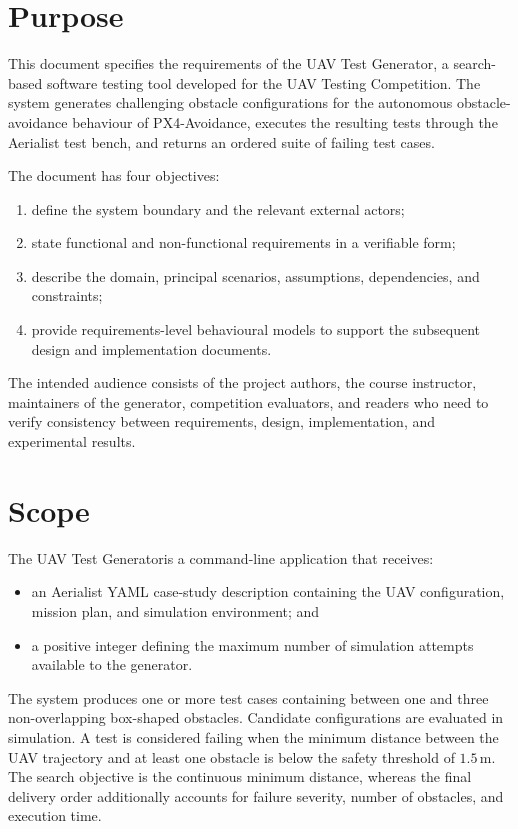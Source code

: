 \documentclass[11pt,a4paper]{report}
\newcommand{\systemname}{UAV Test Generator}
\begin{document}
\section{Purpose}
This document specifies the requirements of the \systemname, a search-based software testing tool developed for the UAV Testing Competition. The system generates challenging obstacle configurations for the autonomous obstacle-avoidance behaviour of PX4-Avoidance, executes the resulting tests through the Aerialist test bench, and returns an ordered suite of failing test cases.

The document has four objectives:
\begin{enumerate}
  \item define the system boundary and the relevant external actors;
  \item state functional and non-functional requirements in a verifiable form;
  \item describe the domain, principal scenarios, assumptions, dependencies, and constraints;
  \item provide requirements-level behavioural models to support the subsequent design and implementation documents.
\end{enumerate}

The intended audience consists of the project authors, the course instructor, maintainers of the generator, competition evaluators, and readers who need to verify consistency between requirements, design, implementation, and experimental results.

\section{Scope}
The \systemname is a command-line application that receives:
\begin{itemize}
  \item an Aerialist YAML case-study description containing the UAV configuration, mission plan, and simulation environment; and
  \item a positive integer defining the maximum number of simulation attempts available to the generator.
\end{itemize}

The system produces one or more test cases containing between one and three non-overlapping box-shaped obstacles. Candidate configurations are evaluated in simulation. A test is considered failing when the minimum distance between the UAV trajectory and at least one obstacle is below the safety threshold of $1.5\,\mathrm{m}$. The search objective is the continuous minimum distance, whereas the final delivery order additionally accounts for failure severity, number of obstacles, and execution time.
\end{document}
